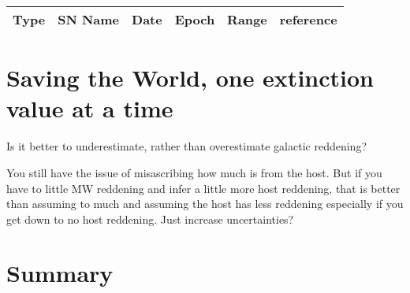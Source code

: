 \documentclass[twocolumn]{aastex61}
\begin{document}
\begin{figure*}
\caption{The central value of A$_V$ is plotted with respect to the mean of the A$_V$ values 20\arcmin away in each of the four cardinal directions.  102 random positions are plotted in grey.  The sample from \citet{Rice_etal_1998} which should have already been removed are blue triangles.  Nearby galaxies used to calibrate the Cepheid-SN distance ladder \citep{Riess_etal_2016} are plotted as red triangles.  The sample of Swift supernovae that I care about are green triangles.  A 1:1 line shows perfect agreement between the values.
\label{fig_av}}
\end{figure*}



\begin{figure*}
\caption{Left Panel: galaxies  Right Panel: A$_V$ v. radius from center in the four cardinal directions.
\label{fig_av}}
\end{figure*}




\begin{table*}
\caption{Problematic Galaxies}
\label{table_templates}
\begin{tabular}{lccccc}
\hline
\hline
Type    & SN Name & Date & Epoch & Range & reference \\




\hline
\hline
\end{tabular}
\end{table*}

\section{Saving the World, one extinction value at a time  \label{sec_templates}}

Is it better to underestimate, rather than overestimate galactic reddening?

You still have the issue of misascribing how much is from the host.  But if you have to little MW reddening and infer a little more host reddening, that is better than assuming to much and assuming the host has less reddening especially if you get down to no host reddening.  Just increase uncertainties?



\section{Summary\label{sec_summary}}
\end{document}
